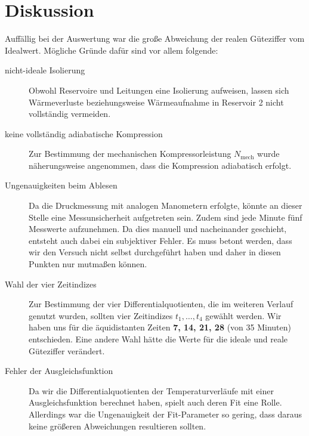 \section{Diskussion}
Auffällig bei der Auswertung war die große Abweichung der realen Güteziffer vom Idealwert. Mögliche Gründe dafür sind vor allem folgende:
\begin{description}
  \item[nicht-ideale Isolierung]
  Obwohl Reservoire und Leitungen eine Isolierung aufweisen,
  lassen sich Wärmeverluste beziehungsweise Wärmeaufnahme in Reservoir 2 nicht vollständig vermeiden.

  \item[keine vollständig adiabatische Kompression]
  Zur Bestimmung der mechanischen Kompressorleistung $N_\text{mech}$ wurde näherungsweise angenommen,
  dass die Kompression adiabatisch erfolgt.

  \item[Ungenauigkeiten beim Ablesen]
  Da die Druckmessung mit analogen Manometern erfolgte,
  könnte an dieser Stelle eine Messunsicherheit aufgetreten sein.
  Zudem sind jede Minute fünf Messwerte aufzunehmen.
  Da dies manuell und nacheinander geschieht,
  entsteht auch dabei ein subjektiver Fehler.
  Es muss betont werden,
  dass wir den Versuch nicht selbst durchgeführt haben und daher in diesen Punkten nur mutmaßen können.

  \item[Wahl der vier Zeitindizes] Zur Bestimmung der vier Differentialquotienten, die im weiteren Verlauf genutzt wurden, sollten vier Zeitindizes $t_1, \ldots, t_4$ gewählt werden. Wir haben uns für die äquidistanten Zeiten \textbf{7, 14, 21, 28} (von 35 Minuten) entschieden. Eine andere Wahl hätte die Werte für die ideale und reale Güteziffer verändert.

  \item[Fehler der Ausgleichsfunktion]
  Da wir die Differentialquotienten der Temperaturverläufe mit einer Ausgleichsfunktion berechnet haben, spielt auch deren Fit eine Rolle. Allerdings war die Ungenauigkeit der Fit-Parameter so gering, dass daraus keine größeren Abweichungen resultieren sollten.
\end{description}
